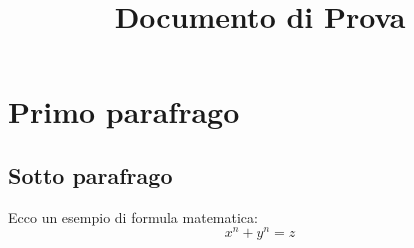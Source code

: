 \documentclass[12pt,a4paper]{article}
\title{Documento di Prova}
\author{}
\date{}
\begin{document}
\maketitle
\tableofcontents
\newpage

\section{Primo parafrago}
\subsection{Sotto parafrago}

Ecco un esempio di formula matematica:
\[x^n + y^n = z\]

\end{document}
